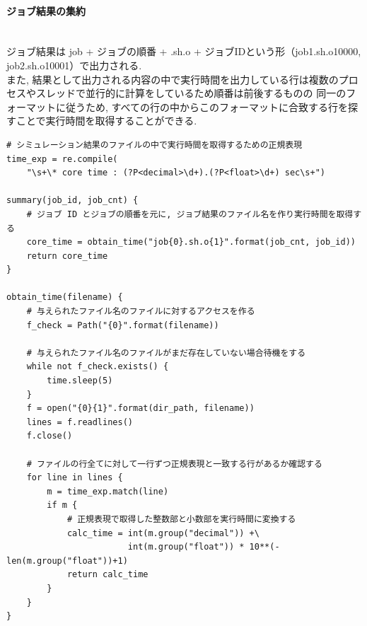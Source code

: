 \paragraph{ジョブ結果の集約}~\\
ジョブ結果は job + ジョブの順番 + .sh.o + ジョブIDという形（job1.sh.o10000, job2.sh.o10001）で出力される.\\
また, 結果として出力される内容の中で実行時間を出力している行は複数のプロセスやスレッドで並行的に計算をしているため順番は前後するものの
同一のフォーマットに従うため, すべての行の中からこのフォーマットに合致する行を探すことで実行時間を取得することができる.\\
{\footnotesize
\begin{lstlisting}[numbers=none, caption=ジョブ結果の集約　疑似コード]
# シミュレーション結果のファイルの中で実行時間を取得するための正規表現
time_exp = re.compile(
    "\s+\* core time : (?P<decimal>\d+).(?P<float>\d+) sec\s+")

summary(job_id, job_cnt) {
    # ジョブ ID とジョブの順番を元に, ジョブ結果のファイル名を作り実行時間を取得する
    core_time = obtain_time("job{0}.sh.o{1}".format(job_cnt, job_id))
    return core_time
}

obtain_time(filename) {
    # 与えられたファイル名のファイルに対するアクセスを作る
    f_check = Path("{0}".format(filename))

    # 与えられたファイル名のファイルがまだ存在していない場合待機をする
    while not f_check.exists() {
        time.sleep(5)
    }
    f = open("{0}{1}".format(dir_path, filename))
    lines = f.readlines()
    f.close()

    # ファイルの行全てに対して一行ずつ正規表現と一致する行があるか確認する
    for line in lines {
        m = time_exp.match(line)
        if m {
            # 正規表現で取得した整数部と小数部を実行時間に変換する
            calc_time = int(m.group("decimal")) +\
                        int(m.group("float")) * 10**(-len(m.group("float"))+1)
            return calc_time
        }
    }
}
\end{lstlisting}
}


